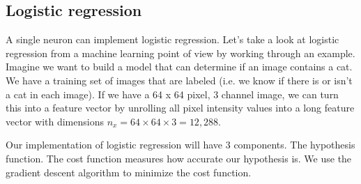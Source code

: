\subsection{Logistic regression}
A single neuron can implement logistic regression. Let's take a look at logistic regression from a machine learning point of view by working through an example. 
Imagine we want to build a model that can determine if an image contains a cat. We have a training set of images that are labeled (i.e. we know if there is or isn't a cat in each image). If we have a 64 x 64 pixel, 3 channel image, we can turn this into a feature vector by unrolling all pixel intensity values into a long feature vector with dimensions $n_{x} = 64 \times 64 \times 3 = 12,288$.


Our implementation of logistic regression will have 3 components. The hypothesis function. The cost function measures how accurate our hypothesis is. We use the gradient descent algorithm to minimize the cost function. 

